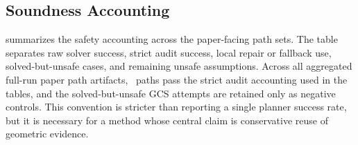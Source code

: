 \subsection{Soundness Accounting}\label{sec:exp_soundness}

 summarizes the safety accounting across the paper-facing path sets. The table separates raw solver success, strict audit success, local repair or fallback use, solved-but-unsafe cases, and remaining unsafe assumptions. Across all aggregated full-run paper path artifacts, \TroPaperAuditPass\ paths pass the strict audit accounting used in the tables, and the solved-but-unsafe GCS attempts are retained only as negative controls. This convention is stricter than reporting a single planner success rate, but it is necessary for a method whose central claim is conservative reuse of geometric evidence.


